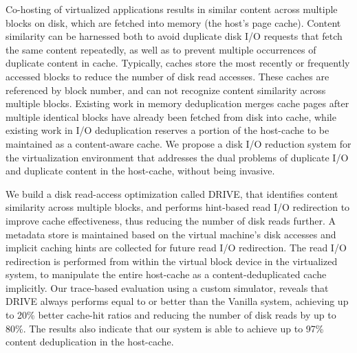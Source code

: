 
Co-hosting of virtualized applications results in similar content 
across multiple blocks on disk, which are fetched into memory (the 
host's page cache). Content similarity can be harnessed both to
avoid duplicate disk I/O requests that fetch the same content 
repeatedly, as well as to prevent multiple occurrences of duplicate 
content in cache.
Typically, caches store the most recently or frequently
accessed blocks to reduce the number of disk read accesses. 
These caches are referenced by block number, and can not recognize content 
similarity across multiple
blocks. Existing work in memory deduplication merges cache pages after
multiple identical blocks have already been fetched from disk into cache, 
while existing work in I/O deduplication reserves a portion of the
host-cache to be maintained as a content-aware cache.
We propose a disk I/O reduction system for the virtualization environment
that addresses the dual problems of duplicate I/O and duplicate content 
in the host-cache, without being invasive.

We build a disk read-access optimization called DRIVE, that 
identifies content similarity across multiple blocks, and performs
hint-based read I/O redirection to improve cache effectiveness,
thus reducing the number of disk reads further.
A metadata store is maintained based on the virtual machine's disk
accesses and implicit caching hints are collected 
for future read I/O redirection.
The read I/O redirection is performed from within the virtual 
block device in the virtualized system, to manipulate the entire 
host-cache as a content-deduplicated cache implicitly.
Our trace-based evaluation using a custom simulator, reveals that 
DRIVE always performs equal to or better than the Vanilla system, 
achieving up to 20\% better cache-hit ratios and reducing the
number of disk reads by up to 80\%. The results also indicate that
our system is able to achieve up to 97\% content deduplication in
the host-cache.
